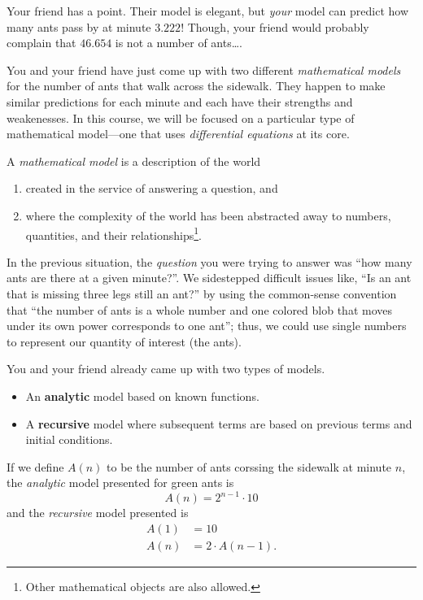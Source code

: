 Your friend has a point. Their model is elegant, but \emph{your} model can predict how many ants pass by at minute $3.222$!
Though, your friend would probably complain that $46.654$ is not a number of ants\ldots.

\medskip

You and your friend have just come up with two different \emph{mathematical models} for the number of ants
that walk across the sidewalk. They happen to make similar predictions for each minute and each have their
strengths and weakenesses. In this course, we will be focused on a particular type of mathematical model---one
that uses \emph{differential equations} at its core.


\begin{definition}
A \emph{mathematical model} is a description of the world
	\begin{enumerate}
		\item created in the service of answering a question, and
		\item where the complexity of the world has been abstracted away to numbers, quantities, and their relationships\footnote{ Other
mathematical objects are also allowed.}.
	\end{enumerate}
\end{definition}

In the previous situation, the \emph{question} you were trying to answer was ``how many ants are there at a given minute?''.
We sidestepped difficult issues like, ``Is an ant that is missing three legs still an ant?'' by using the common-sense
convention that ``the number of ants is a whole number and one colored blob that moves under its own power corresponds to one ant''; thus,
we could use single numbers to represent our quantity of interest (the ants).

You and your friend already came up with two types of models.
\begin{itemize}
	\item An \textbf{analytic} model based on known functions.
	\item A \textbf{recursive} model where subsequent terms are based on previous terms and initial conditions.
\end{itemize}

If we define $A(n)$ to be the number of ants corssing the sidewalk at minute $n$, the \emph{analytic} model presented for green ants is
\[
	A(n)=2^{n-1}\cdot 10
\]
and the \emph{recursive} model presented is
\begin{align*}
	A(1) &= 10\\
	A(n) &= 2\cdot A(n-1).
\end{align*}

